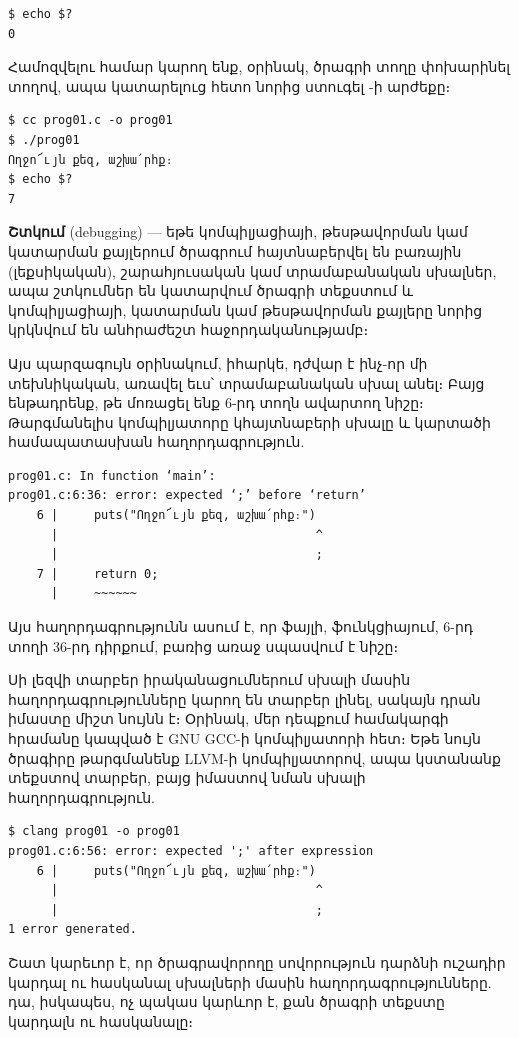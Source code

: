 \begin{Verbatim}
$ echo $?
0
\end{Verbatim}

Համոզվելու համար կարող ենք, օրինակ, ծրագրի  տողը
փոխարինել  տողով, ապա կատարելուց հետո նորից 
ստուգել -ի արժեքը։

\begin{Verbatim}
$ cc prog01.c -o prog01
$ ./prog01
Ողջո՜ւյն քեզ, աշխա՛րհք։
$ echo $?
7
\end{Verbatim}    

\noindent\textbf{Շտկում} (debugging) --- եթե կոմպիլյացիայի, թեսթավորման
կամ կատարման քայլերում ծրագրում հայտնաբերվել են բառային (լեքսիկական),
շարահյուսական կամ տրամաբանական սխալներ,  ապա շտկումներ են կատարվում
ծրագրի տեքստում և կոմպիլյացիայի, կատարման կամ թեսթավորման քայլերը
նորից կրկնվում են անհրաժեշտ հաջորդականությամբ։

Այս պարզագույն օրինակում, իհարկե, դժվար է ինչ-որ մի տեխնիկական, 
առավել եւս՝ տրամաբանական սխալ անել։ Բայց ենթադրենք, թե մոռացել ենք 
6-րդ տողն ավարտող \code{;} նիշը։ Թարգմանելիս կոմպիլյատորը կհայտնաբերի 
սխալը և կարտածի համապատասխան հաղորդագրություն.

\begin{Verbatim}
prog01.c: In function ‘main’:
prog01.c:6:36: error: expected ‘;’ before ‘return’
    6 |     puts("Ողջո՜ւյն քեզ, աշխա՛րհք։")
      |                                    ^
      |                                    ;
    7 |     return 0;
      |     ~~~~~~          
\end{Verbatim}

Այս հաղորդագրությունն ասում է, որ  ֆայլի, 
 ֆունկցիայում, 6-րդ տողի 36-րդ դիրքում, 
բառից առաջ սպասվում է \code{;} նիշը։

Սի լեզվի տարբեր իրականացումներում սխալի մասին հաղորդագրությունները
կարող են տարբեր լինել, սակայն դրան իմաստը միշտ նույնն է։ Օրինակ, 
մեր դեպքում համակարգի  հրամանը կապված է GNU GCC-ի 
 կոմպիլյատորի հետ։ Եթե նույն ծրագիրը թարգմանենք LLVM-ի
 կոմպիլյատորով, ապա կստանանք տեքստով տարբեր, բայց 
իմաստով նման սխալի հաղորդագրություն.

\begin{Verbatim}
$ clang prog01 -o prog01
prog01.c:6:56: error: expected ';' after expression
    6 |     puts("Ողջո՜ւյն քեզ, աշխա՛րհք։")
      |                                    ^
      |                                    ;
1 error generated.
\end{Verbatim}

Շատ կարեւոր է, որ ծրագրավորողը սովորություն դարձնի ուշադիր 
կարդալ ու հասկանալ սխալների մասին հաղորդագրությունները. դա,
իսկապես, ոչ պակաս կարևոր է, քան ծրագրի տեքստը կարդալն ու 
հասկանալը։


